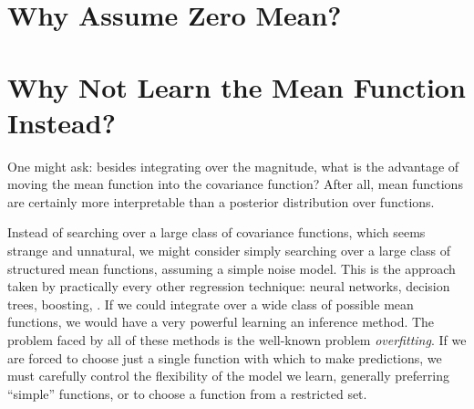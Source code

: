 


\outbpdocument{


}




\iffalse
\section{Why Assume Zero Mean?}

\section{Why Not Learn the Mean Function Instead?}
One might ask: besides integrating over the magnitude, what is the advantage of moving the mean function into the covariance function?
After all, mean functions are certainly more interpretable than a posterior distribution over functions.

Instead of searching over a large class of covariance functions, which seems strange and unnatural, we might consider simply searching over a large class of structured mean functions, assuming a simple \iid noise model.
This is the approach taken by practically every other regression technique: neural networks, decision trees, boosting, \etc.
If we could integrate over a wide class of possible mean functions, we would have a very powerful learning an inference method.
The problem faced by all of these methods is the well-known problem \emph{overfitting}.
If we are forced to choose just a single function with which to make predictions, we must carefully control the flexibility of the model we learn, generally preferring ``simple'' functions, or to choose a function from a restricted set.

